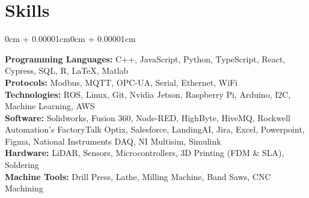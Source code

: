 \documentclass[10pt, letterpaper]{article}
\newenvironment{onecolentry}{
    \begin{adjustwidth}{0cm + 0.00001cm}{0cm + 0.00001cm}
}{
    \end{adjustwidth}
}
\begin{document}
    \section{Skills}
    \begin{onecolentry}
        \textbf{Programming Languages:} C++, JavaScript, Python, TypeScript, React, Cypress, SQL, R, LaTeX, Matlab \\
        \textbf{Protocols:} Modbus, MQTT, OPC-UA, Serial, Ethernet, WiFi \\
        \textbf{Technologies:} ROS, Linux, Git, Nvidia Jetson, Raspberry Pi, Arduino, I2C, Machine Learning, AWS \\
        \textbf{Software:} Solidworks, Fusion 360, Node-RED, HighByte, HiveMQ, Rockwell Automation's FactoryTalk Optix, Salesforce, LandingAI, Jira, Excel, Powerpoint, Figma, National Instruments DAQ, NI Multisim, Simulink \\
        \textbf{Hardware:} LiDAR, Sensors, Microcontrollers, 3D Printing (FDM \& SLA), Soldering \\
        \textbf{Machine Tools:} Drill Press, Lathe, Milling Machine, Band Saws, CNC Machining
    \end{onecolentry}
\end{document}
